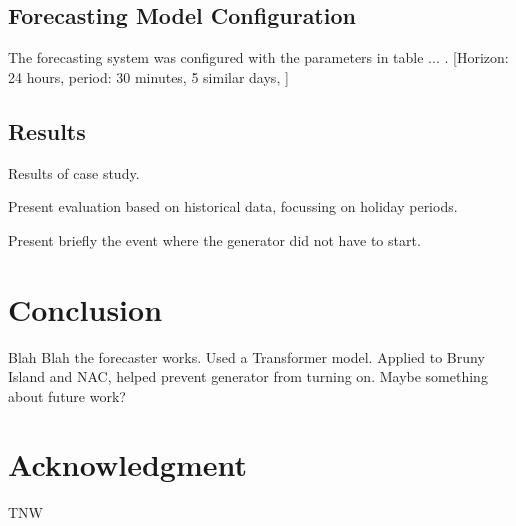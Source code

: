 \documentclass[conference]{IEEEtran}
\begin{document}
\subsection{Forecasting Model Configuration}
The forecasting system was configured with the parameters in table ... .
[Horizon: 24 hours, period: 30 minutes, 5 similar days, ]


\subsection{Results}
Results of case study.

Present evaluation based on historical data, focussing on holiday periods.

Present briefly the event where the generator did not have to start.

\section{Conclusion}
Blah Blah the forecaster works.
Used a Transformer model.
Applied to Bruny Island and NAC, helped prevent generator from turning on.
Maybe something about future work?


\section*{Acknowledgment}
TNW




\end{document}
